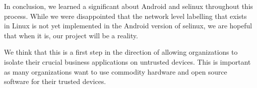 In conclusion, we learned a significant about Android and \ac{selinux} throughout this process.
While we were disappointed that the network level labelling that exists in Linux is not yet implemented in the Android version of \ac{selinux}, we are hopeful that when it is, our project will be a reality.

We think that this is a first step in the direction of allowing organizations to isolate their crucial business applications on untrusted devices.
This is important as many organizations want to use commodity hardware and open source software for their trusted devices.

